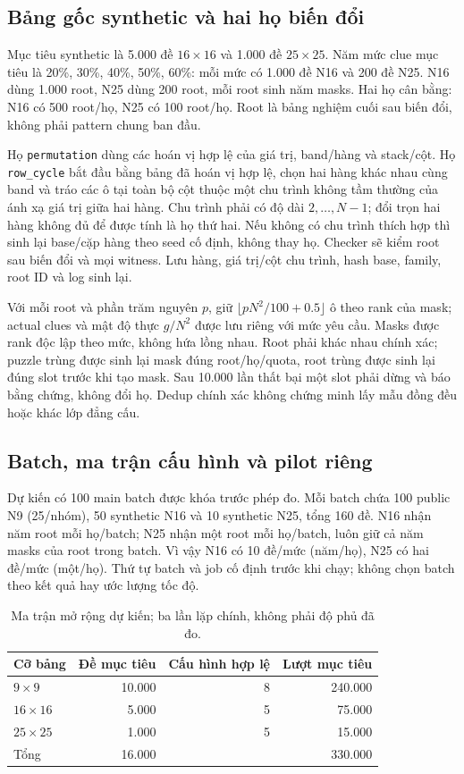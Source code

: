 \subsection{Bảng gốc synthetic và hai họ biến đổi}
Mục tiêu synthetic là 5.000 đề $16\times16$ và 1.000 đề $25\times25$.
Năm mức clue mục tiêu là 20\%, 30\%, 40\%, 50\%, 60\%: mỗi mức có 1.000
đề N16 và 200 đề N25. N16 dùng 1.000 root, N25 dùng 200 root, mỗi root sinh
năm masks. Hai họ cân bằng: N16 có 500 root/họ, N25 có 100 root/họ.
Root là bảng nghiệm cuối sau biến đổi, không phải pattern chung ban đầu.

Họ \texttt{permutation} dùng các hoán vị hợp lệ của giá trị, band/hàng và
stack/cột. Họ \texttt{row\_cycle} bắt đầu bằng bảng đã hoán vị hợp lệ, chọn hai
hàng khác nhau cùng band và tráo các ô tại toàn bộ cột thuộc một chu trình
không tầm thường của ánh xạ giá trị giữa hai hàng. Chu trình phải có độ dài
$2,\ldots,N-1$; đổi trọn hai hàng không đủ để được tính là họ thứ hai.
Nếu không có chu trình thích hợp thì sinh lại base/cặp hàng theo seed cố định,
không thay họ. Checker sẽ kiểm root sau biến đổi và mọi witness.
Lưu hàng, giá trị/cột chu trình, hash base, family, root ID và log sinh lại.

Với mỗi root và phần trăm nguyên $p$, giữ
$\lfloor pN^2/100+0.5\rfloor$ ô theo rank của mask; actual clues và mật độ
thực $g/N^2$ được lưu riêng với mức yêu cầu. Masks được rank độc lập theo mức,
không hứa lồng nhau. Root phải khác nhau chính xác; puzzle trùng được sinh lại
mask đúng root/họ/quota, root trùng được sinh lại đúng slot trước khi tạo mask.
Sau 10.000 lần thất bại một slot phải dừng và báo bằng chứng, không đổi họ.
Dedup chính xác không chứng minh lấy mẫu đồng đều hoặc khác lớp đẳng cấu.

\subsection{Batch, ma trận cấu hình và pilot riêng}
Dự kiến có 100 main batch được khóa trước phép đo. Mỗi batch chứa 100 public
N9 (25/nhóm), 50 synthetic N16 và 10 synthetic N25, tổng 160 đề.
N16 nhận năm root mỗi họ/batch; N25 nhận một root mỗi họ/batch, luôn giữ cả
năm masks của root trong batch. Vì vậy N16 có 10 đề/mức (năm/họ), N25 có hai
đề/mức (một/họ). Thứ tự batch và job cố định trước khi chạy; không chọn batch
theo kết quả hay ước lượng tốc độ.

\begin{table}[pos=H]
\centering
\caption{Ma trận mở rộng dự kiến; ba lần lặp chính, không phải độ phủ đã đo.}
\begin{tabular}{lrrr}
\hline
Cỡ bảng & Đề mục tiêu & Cấu hình hợp lệ & Lượt mục tiêu\\
\hline
$9\times9$ & 10.000 & 8 & 240.000\\
$16\times16$ & 5.000 & 5 & 75.000\\
$25\times25$ & 1.000 & 5 & 15.000\\
\hline
Tổng & 16.000 & & 330.000\\
\hline
\end{tabular}
\end{table}

